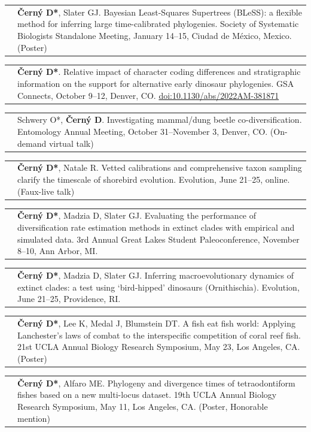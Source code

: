 \documentclass[10pt]{article}
\begin{document}
\begin{tabularx}{\textwidth}{>{\raggedleft\arraybackslash}p{2.2cm} X}
2023 & \textbf{\v{C}ern\'{y} D*}, Slater GJ. Bayesian Least-Squares Supertrees (BLeSS): a flexible method for inferring large time-calibrated phylogenies. Society of Systematic Biologists Standalone Meeting, January 14--15, Ciudad de M\'{e}xico, Mexico. (Poster)
\end{tabularx}
\begin{tabularx}{\textwidth}{>{\raggedleft\arraybackslash}p{2.2cm} X}
2022 & \textbf{\v{C}ern\'{y} D*}. Relative impact of character coding differences and stratigraphic information on the support for alternative early dinosaur phylogenies. GSA Connects, October 9--12, Denver, CO. \href{ https://doi.org/10.1130/abs/2022AM-381871}{doi:10.1130/abs/2022AM-381871}
\end{tabularx}
\begin{tabularx}{\textwidth}{>{\raggedleft\arraybackslash}p{2.2cm} X}
2021 & Schwery O*, \textbf{\v{C}ern\'{y} D}. Investigating mammal/dung beetle co-diversification. Entomology Annual Meeting, October 31--November 3, Denver, CO. (On-demand virtual talk)
\end{tabularx}
\begin{tabularx}{\textwidth}{>{\raggedleft\arraybackslash}p{2.2cm} X}
2021 & \textbf{\v{C}ern\'{y} D*}, Natale R. Vetted calibrations and comprehensive taxon sampling clarify the timescale of shorebird evolution. Evolution, June 21--25, online. (Faux-live talk)
\end{tabularx}
\begin{tabularx}{\textwidth}{>{\raggedleft\arraybackslash}p{2.2cm} X}
2019 & \textbf{\v{C}ern\'{y} D*}, Madzia D, Slater GJ. Evaluating the performance of diversification rate estimation methods in extinct clades with empirical and simulated data. 3rd Annual Great Lakes Student Paleoconference, November 8--10, Ann Arbor, MI.
\end{tabularx}
\begin{tabularx}{\textwidth}{>{\raggedleft\arraybackslash}p{2.2cm} X}
2019 & \textbf{\v{C}ern\'{y} D*}, Madzia D, Slater GJ. Inferring macroevolutionary dynamics of extinct clades: a test using `bird-hipped' dinosaurs (Ornithischia). Evolution, June 21--25, Providence, RI.
\end{tabularx}
\begin{tabularx}{\textwidth}{>{\raggedleft\arraybackslash}p{2.2cm} X}
2018 & \textbf{\v{C}ern\'{y} D*}, Lee K, Medal J, Blumstein DT. A fish eat fish world: Applying Lanchester's laws of combat to the interspecific competition of coral reef fish. 21st UCLA Annual Biology Research Symposium, May 23, Los Angeles, CA. (Poster)
\end{tabularx}
\begin{tabularx}{\textwidth}{>{\raggedleft\arraybackslash}p{2.2cm} X}
2016 & \textbf{\v{C}ern\'{y} D*}, Alfaro ME. Phylogeny and divergence times of tetraodontiform fishes based on a new multi-locus dataset. 19th UCLA Annual Biology Research Symposium, May 11, Los Angeles, CA. (Poster, Honorable mention)
\end{tabularx} \\[1ex]
\end{document}
